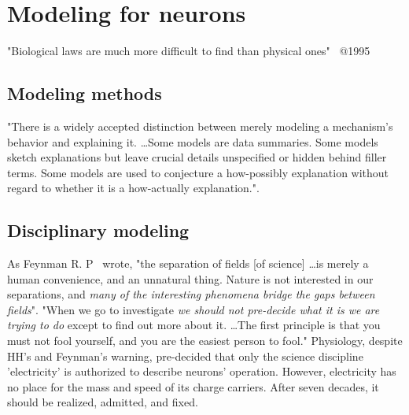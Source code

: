 

\chapter[Modeling]{Modeling for neurons\label{ch:Modeling}}
\iflatexml
\else
\minitoc
\fi




\quotationbox
{
"Biological laws are much more difficult to find than physical ones"~\cite{VollmerLimitsOfBiology:1995} @1995
}


\section[Methods]{Modeling methods\label{sec:Modeling-Methods}}
{"There is a widely accepted distinction between merely modeling a mechanism's behavior and explaining it. \dots Some models are data summaries. Some
models sketch explanations but leave crucial details unspecified or hidden behind
filler terms. Some models are used to conjecture a how-possibly explanation without regard to whether it is a how-actually explanation."\cite{MechanisticModelHodgkinHuxleyCraver:2006}.
}


\section[Disciplinarity]{Disciplinary modeling\label{sec:Modeling-isciplinarity}}
As Feynman R. P~\cite{FeynmanThinking:1980} wrote, "the separation of fields [of science] \dots is merely a human convenience, and an unnatural thing.
Nature is not interested in our separations, and \textit{many of the interesting phenomena bridge the gaps between fields}". "When we go to investigate \textit{we should not pre-decide what it is we are trying to do} except to find out more about it. \dots The first principle is that you must not fool yourself, and you are the easiest person to fool."
Physiology, despite \gls{HH}'s and Feynman's warning, pre-decided that only the science discipline 'electricity' is authorized to describe neurons' operation.
However, electricity has no place for the mass and speed of its charge carriers. After seven decades, it should be realized, admitted, and fixed.



